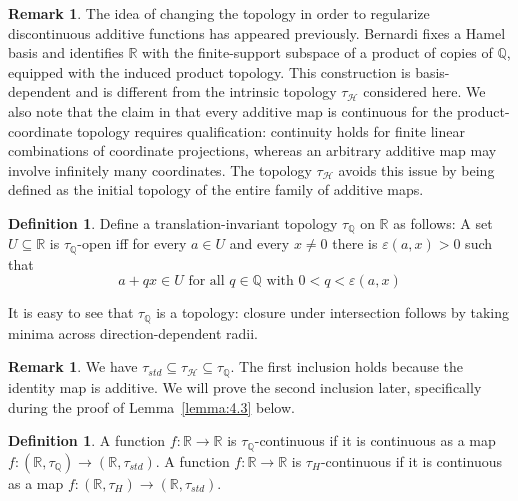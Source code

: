 \documentclass[11pt]{amsart} %
\theoremstyle{definition}
\newtheorem{definition}[theorem]{Definition}
\newtheorem{remark}[theorem]{Remark}
\newcommand{\R}{\mathbb{R}}
\newcommand{\Q}{\mathbb{Q}}
\newcommand{\AD}{\mathcal{H}}
\begin{document}
\begin{remark} 
The idea of changing the topology in order to regularize discontinuous
additive functions has appeared previously.  Bernardi
\cite{40} fixes a Hamel basis and identifies $\R$ with the
finite-support subspace of a product of copies of $\Q$, equipped with the
induced product topology.  This construction is basis-dependent and is
different from the intrinsic topology $\tau_{\mathcal H}$ considered here.
We also note that the claim in \cite{40} that every additive map is
continuous for the product-coordinate topology requires qualification:
continuity holds for finite linear combinations of coordinate projections,
whereas an arbitrary additive map may involve infinitely many coordinates.
The topology $\tau_{\AD}$ avoids this issue by being defined as the
initial topology of the entire family of additive maps.
\end{remark} 

\begin{definition}%
Define a translation-invariant topology $\tau_{\Q}$ on
$\mathbb{R}$ as follows: 
A set $U\subseteq\mathbb{R}$ is $\tau_{\Q}$-open iff for every $a\in U$ and every $x\neq 0$ there is $\varepsilon(a,x)>0$ such that 
\begin{equation} 
a+qx\in U \mbox{ for all }q\in \Q\mbox{ with }0<q<\varepsilon(a,x)
\end{equation} 
\label{def:tauq}

It is easy to see that $\tau_{\Q}$ is a topology: closure under intersection follows by taking minima across direction-dependent radii. 

\end{definition}

\begin{remark} 
We have $\tau_{std}\subseteq \tau_{\AD}\subseteq \tau_{\Q}$. The first inclusion holds because the identity map is additive. We will prove the second inclusion later, specifically during the proof of Lemma~\ref{lemma:4.3} below. 
\end{remark} 

\begin{definition}
A function $f:\mathbb{R}\rightarrow\mathbb{R}$ is $\tau_{\Q}$-continuous if it is continuous as a
map $f:(\mathbb{R},\tau_{\Q})\rightarrow(\mathbb{R},\tau_{std})$. A function $f:\mathbb{R}\rightarrow\mathbb{R}$ is
$\tau_{H}$-continuous if it is continuous as a
map $f:(\mathbb{R},\tau_{H})\rightarrow(\mathbb{R},\tau_{std})$.
\end{definition}
\end{document}
